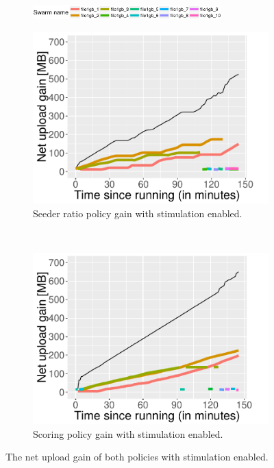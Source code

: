 \begin{figure}[h]
	\begin{adjustwidth}{-1.5cm}{}
		\begin{subfigure}[t]{1.2\textwidth}
			\centering
			\includegraphics[width=0.8\textwidth]{pics/results/legends.eps}
		\end{subfigure}
		\begin{subfigure}[b]{0.6\textwidth}
			\vspace{-0.2cm}
			\centering
			\includegraphics[width=\textwidth]{pics/results/simple3_sr_trig.pdf}
			\caption{Seeder ratio policy gain with stimulation enabled.}
			\label{fig:simplesrtrig}
		\end{subfigure}
		~
		\begin{subfigure}[b]{0.6\textwidth}
			\vspace{-0.2cm}
			\centering
			\includegraphics[width=\textwidth]{pics/results/simple1_scsr_trig.pdf}
			\caption{Scoring policy gain with stimulation enabled.}
			\label{fig:simplescsrtrig}
		\end{subfigure}
		\caption{The net upload gain of both policies with stimulation enabled.}
	\end{adjustwidth}
\end{figure}


